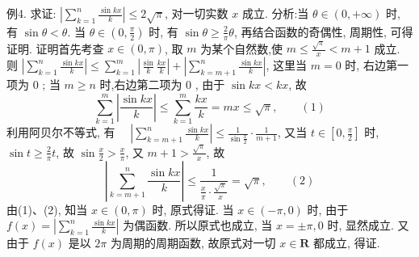 例4. 求证: $\left|\sum_{k=1}^n \frac{\sin k x}{k}\right| \leqslant 2 \sqrt{\pi}$, 对一切实数 $x$ 成立.
分析:当 $\theta \in(0,+\infty)$ 时, 有 $\sin \theta<\theta$. 当 $\theta \in\left(0, \frac{\pi}{2}\right)$ 时, 有 $\sin \theta \geqslant \frac{2}{\pi} \theta$, 再结合函数的奇偶性, 周期性, 可得证明.
证明首先考查 $x \in(0, \pi)$, 取 $m$ 为某个自然数,使 $m \leqslant \frac{\sqrt{\pi}}{x}<m+1$ 成立.
则 $\left|\sum_{k=1}^n \frac{\sin k x}{k}\right| \leqslant \sum_{k=1}^m\left|\frac{\sin }{k} \frac{k x}{k}\right|+\left|\sum_{k=m+1}^n \frac{\sin k x}{k}\right|$, 这里当 $m=0$ 时, 右边第一项为 0 ; 当 $m \geqslant n$ 时,右边第二项为 0 , 由于 $\sin k x<k x$, 故
$$
\sum_{k=1}^m\left|\frac{\sin k x}{k}\right| \leqslant \sum_{k=1}^m \frac{k x}{k}=m x \leqslant \sqrt{\pi}, \quad\quad(1)
$$
利用阿贝尔不等式, 有 $\quad\left|\sum_{k=m+1}^n \frac{\sin k x}{k}\right| \leqslant \frac{1}{\sin \frac{x}{2}} \cdot \frac{1}{m+1}$,
又当 $t \in\left[0, \frac{\pi}{2}\right]$ 时, $\sin t \geqslant \frac{2}{\pi} t$, 故 $\sin \frac{x}{2}>\frac{x}{\pi}$, 又 $m+1>\frac{\sqrt{\pi}}{x}$, 故
$$
\left|\sum_{k=m+1}^n \frac{\sin k x}{k}\right| \leqslant \frac{1}{\frac{x}{\pi} \cdot \frac{\sqrt{\pi}}{x}}=\sqrt{\pi}, \quad\quad(2)
$$
由(1)、(2), 知当 $x \in(0, \pi)$ 时, 原式得证.
当 $x \in(-\pi, 0)$ 时, 由于 $f(x)=\left|\sum_{k=1}^n \frac{\sin k x}{k}\right|$ 为偶函数.
所以原式也成立, 当 $x= \pm \pi, 0$ 时, 显然成立.
又由于 $f(x)$ 是以 $2 \pi$ 为周期的周期函数, 故原式对一切 $x \in \mathbf{R}$ 都成立, 得证.



